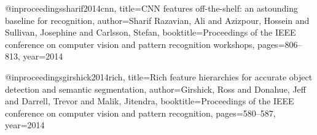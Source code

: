 \begin{thebibliography}{99}



@inproceedings{sharif2014cnn,
  title={CNN features off-the-shelf: an astounding baseline for recognition},
  author={Sharif Razavian, Ali and Azizpour, Hossein and Sullivan, Josephine and Carlsson, Stefan},
  booktitle={Proceedings of the IEEE conference on computer vision and pattern recognition workshops},
  pages={806--813},
  year={2014}
}

@inproceedings{girshick2014rich,
  title={Rich feature hierarchies for accurate object detection and semantic segmentation},
  author={Girshick, Ross and Donahue, Jeff and Darrell, Trevor and Malik, Jitendra},
  booktitle={Proceedings of the IEEE conference on computer vision and pattern recognition},
  pages={580--587},
  year={2014}
}



\end{thebibliography}
